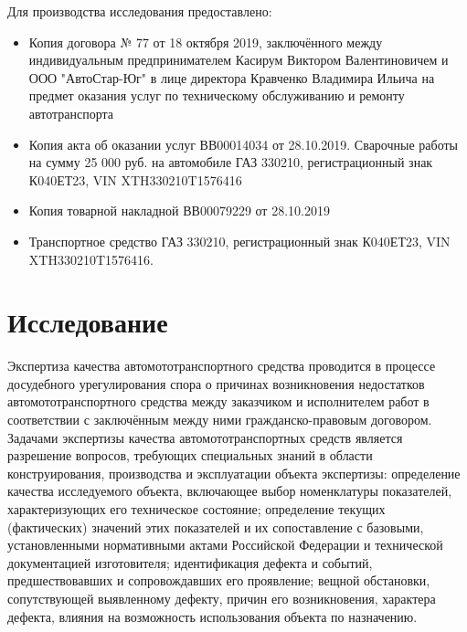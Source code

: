 Для производства исследования предоставлено:
\begin{itemize}
	\item Копия договора № 77 от 18 октября 2019, заключённого между индивидуальным предпринимателем Касирум Виктором Валентиновичем и ООО "АвтоСтар-Юг" в лице директора Кравченко Владимира Ильича на предмет оказания услуг по техническому обслуживанию и ремонту автотранспорта 
	\item Копия акта об оказании услуг ВВ00014034 от 28.10.2019. Сварочные работы на сумму 25 000 руб.  на автомобиле ГАЗ 330210, регистрационный знак К040ЕТ23, VIN XTH330210T1576416
	\item Копия товарной накладной ВВ00079229 от 28.10.2019
	\item Транспортное средство ГАЗ 330210, регистрационный знак К040ЕТ23, VIN XTH330210T1576416.
	\end{itemize}

%



\section{Исследование}
%
Экспертиза качества автомототранспортного средства проводится в процессе досудебного урегулирования спора о причинах возникновения недостатков автомототранспортного средства между заказчиком и  исполнителем работ в соответствии  с заключённым между ними гражданско-правовым договором.
Задачами экспертизы качества автомототранспортных средств является разрешение вопросов, требующих специальных знаний в области конструирования, производства и эксплуатации объекта экспертизы: определение качества исследуемого объекта, включающее выбор номенклатуры показателей, характеризующих его техническое состояние; определение текущих (фактических) значений этих показателей и их сопоставление с базовыми, установленными нормативными актами Российской Федерации и технической документацией изготовителя; идентификация дефекта и событий, предшествовавших и сопровождавших его проявление; вещной обстановки, сопутствующей выявленному дефекту, причин его возникновения, характера дефекта, влияния на возможность использования объекта по назначению.

